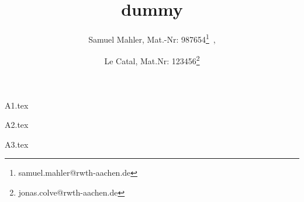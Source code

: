 \documentclass[12pt,a4paper]{scrartcl}
\author{Samuel Mahler, Mat.-Nr: 987654\thanks{samuel.mahler@rwth-aachen.de}\ ,
		\and Le Catal, Mat.Nr: 123456\thanks{jonas.colve@rwth-aachen.de}}
\title{dummy}
\begin{document}
\parindent0cm

\maketitle

\newpage


{A1.tex}


{A2.tex}


{A3.tex}




\end{document}
